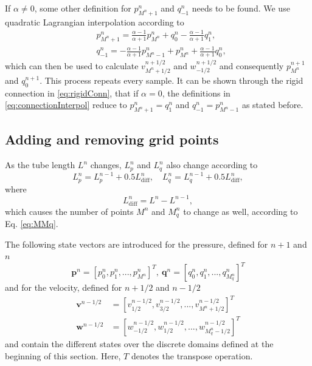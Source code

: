%
If $\alpha \neq 0$, some other definition for $p_{{M^n}+1}^n$ and $q_{-1}^n$ needs to be found. We use quadratic Lagrangian interpolation according to
\begin{subequations}\label{eq:connectionInterpol}
\begin{align}
        &p_{M^n+1}^n = \frac{\alpha - 1}{\alpha + 1}p_{M^n}^n + q_0^n - \frac{\alpha - 1}{\alpha + 1}q_1^n,
    \label{eq:calcPMp1}\\
        &q_{-1}^n
        =-\frac{\alpha - 1}{\alpha + 1}p_{M^n-1}^n + p_{M^n}^n+ \frac{\alpha - 1}{\alpha + 1}q_{0}^n\label{eq:calcQm1},
\end{align}
\end{subequations}
which can then be used to calculate $v_{M^n+1/2}^{n+1/2}$ and $w_{-1/2}^{n+1/2}$ and consequently $p_{M^n}^{n+1}$ and $q_0^{n+1}$. This process repeats every sample. It can be shown through the rigid connection in \eqref{eq:rigidConn}, that if $\alpha=0$, the definitions in \eqref{eq:connectionInterpol} reduce to $p_{M^n+1}^n = q_1^n$ and $q_{-1}^n = p_{M^n-1}^n$ as stated before.

\subsection{Adding and removing grid points}\label{sec:addRemove}
As the tube length $L^n$ changes, $L_p^n$ and $L_q^n$ also change according to
\begin{equation}
    L_p^n = L_p^{n-1} + 0.5 L_\text{diff}^n, \quad L_q^n =  L_q^{n-1} + 0.5L_\text{diff}^n,\label{eq:updateLs} 
\end{equation}
where
\begin{equation}
    L_\text{diff}^n = L^n-L^{n-1},\label{eq:lDiff}
\end{equation}
which causes the number of points $M^n$ and $M_q^n$ to change as well, according to Eq. \eqref{eq:MMq}.

The following state vectors are introduced for the pressure, defined for $n+1$ and $n$ %
\begin{equation}
    \mathbf{p}^n = [p_0^n, p_1^n, ..., p_{M^n}^n]^T,\ \mathbf{q}^n = [q_0^n, q_1^n, ..., q_{M_q^n}^n]^T
\end{equation}
and for the velocity, defined for $n+1/2$ and $n-1/2$
\begin{equation}
    \begin{aligned}
        \mathbf{v}^{n-1/2} &=  [v_{1/2}^{n-1/2}, v_{3/2}^{n-1/2}, ..., v_{M^n+1/2}^{n-1/2}]^T\\
        \mathbf{w}^{n-1/2} &=  [w_{-1/2}^{n-1/2}, w_{1/2}^{n-1/2}, ..., w_{M_q^n-1/2}^{n-1/2}]^T
    \end{aligned}
\end{equation}
and contain the different states over the discrete domains defined at the beginning of this section. Here, $T$ denotes the transpose operation.


